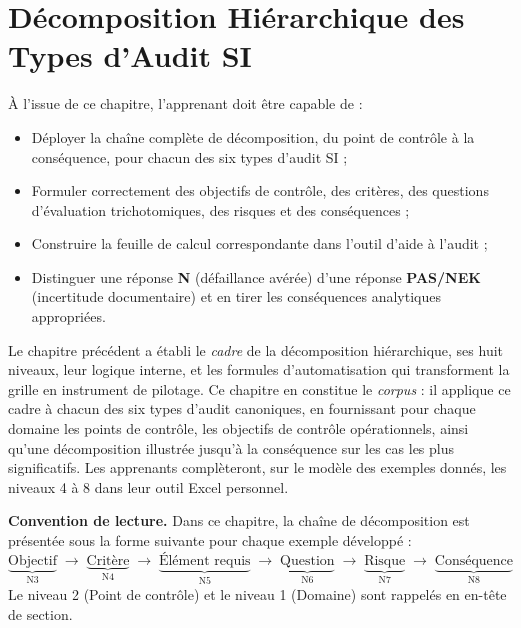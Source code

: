 
\chapter{Décomposition Hiérarchique des Types d'Audit SI}
\label{chap:decomposition}

\begin{boxobjectifs}
À l'issue de ce chapitre, l'apprenant doit être capable de :
\begin{itemize}
    \item Déployer la chaîne complète de décomposition, du point de contrôle à la conséquence, pour chacun des six types d'audit SI ;
    \item Formuler correctement des objectifs de contrôle, des critères, des questions d'évaluation trichotomiques, des risques et des conséquences ;
    \item Construire la feuille de calcul correspondante dans l'outil d'aide à l'audit ;
    \item Distinguer une réponse \textbf{N} (défaillance avérée) d'une réponse \textbf{PAS/NEK} (incertitude documentaire) et en tirer les conséquences analytiques appropriées.
\end{itemize}
\end{boxobjectifs}

Le chapitre précédent a établi le \textit{cadre} de la décomposition hiérarchique, ses huit niveaux, leur logique interne, et les formules d'automatisation qui transforment la grille en instrument de pilotage. Ce chapitre en constitue le \textit{corpus} : il applique ce cadre à chacun des six types d'audit canoniques, en fournissant pour chaque domaine les points de contrôle, les objectifs de contrôle opérationnels, ainsi qu'une décomposition illustrée jusqu'à la conséquence sur les cas les plus significatifs. Les apprenants complèteront, sur le modèle des exemples donnés, les niveaux 4 à 8 dans leur outil Excel personnel.

\begin{boxinfo}[font=\small]
\textbf{Convention de lecture.} Dans ce chapitre, la chaîne de décomposition est présentée sous la forme suivante pour chaque exemple développé :
\[
\underbrace{\text{Objectif}}_{\text{N3}} \;\longrightarrow\; \underbrace{\text{Critère}}_{\text{N4}} \;\longrightarrow\; \underbrace{\text{Élément requis}}_{\text{N5}} \;\longrightarrow\; \underbrace{\text{Question}}_{\text{N6}} \;\longrightarrow\; \underbrace{\text{Risque}}_{\text{N7}} \;\longrightarrow\; \underbrace{\text{Conséquence}}_{\text{N8}}
\]
Le niveau 2 (Point de contrôle) et le niveau 1 (Domaine) sont rappelés en en-tête de section.
\end{boxinfo}



